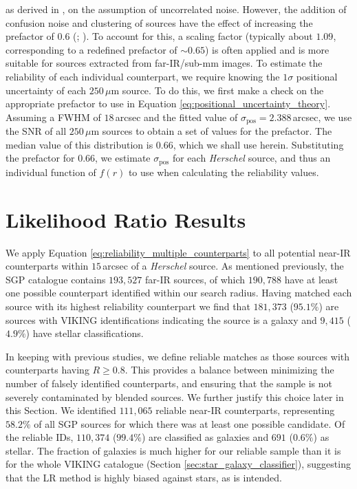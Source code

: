 \noindent as derived in \citealt{Ivison_2007}, on the assumption of uncorrelated noise. However, the addition of confusion noise and clustering of sources have the effect of increasing the prefactor of $0.6$ (\citealt{Chapin_2011}; \citealt{Bourne_2014}). To account for this, a scaling factor (typically about $1.09$, corresponding to a redefined prefactor of $\sim 0.65$) is often applied and is more suitable for sources extracted from far-IR/sub-mm images. To estimate the reliability of each individual counterpart, we require knowing the $1\sigma$ positional uncertainty of each $250\,\mu$m source. To do this, we first make a check on the appropriate prefactor to use in Equation \ref{eq:positional_uncertainty_theory}. Assuming a FWHM of $18\,$arcsec and the fitted value of $\sigma_{\textrm{pos}} = 2.388\,$arcsec, we use the SNR of all $250\,\mu$m sources to obtain a set of values for the prefactor. The median value of this distribution is $0.66$, which we shall use herein. Substituting the prefactor for $0.66$, we estimate $\sigma_{\textrm{pos}}$ for each \textit{Herschel} source, and thus an individual function of $f(r)$ to use when calculating the reliability values.

\section{Likelihood Ratio Results}
\label{sec:lr_results}

We apply Equation \ref{eq:reliability_multiple_counterparts} to all potential near-IR counterparts within $15\,$arcsec of a \textit{Herschel} source. As mentioned previously, the SGP catalogue contains $193,527$ far-IR sources, of which $190,788$ have at least one possible counterpart identified within our search radius. Having matched each source with its highest reliability counterpart we find that $181,373$ ($95.1\%$) are sources with VIKING identifications indicating the source is a galaxy and $9,415$ ($4.9\%$) have stellar classifications. 

In keeping with previous studies, we define reliable matches as those sources with counterparts having $R \geq 0.8$. This provides a balance between minimizing the number of falsely identified counterparts, and ensuring that the sample is not severely contaminated by blended sources. We further justify this choice later in this Section. We identified $111,065$ reliable near-IR counterparts, representing $58.2\%$ of all SGP sources for which there was at least one possible candidate. Of the reliable IDs, $110,374$ ($99.4\%$) are classified as galaxies and $691$ ($0.6\%$) as stellar. The fraction of galaxies is much higher for our reliable sample than it is for the whole VIKING catalogue (Section \ref{sec:star_galaxy_classifier}), suggesting that the LR method is highly biased against stars, as is intended. 

